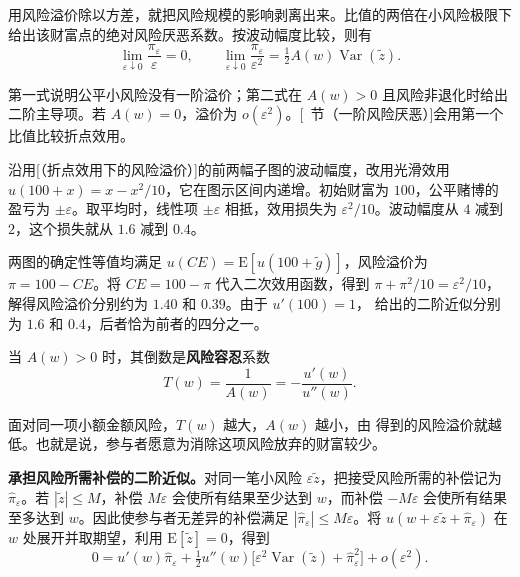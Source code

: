 用风险溢价除以方差，就把风险规模的影响剥离出来。比值的两倍在小风险极限下给出该财富点的绝对风险厌恶系数。按波动幅度比较，则有
\[
 \lim_{\varepsilon\downarrow0}\frac{\pi_\varepsilon}{\varepsilon}=0,
 \qquad
 \lim_{\varepsilon\downarrow0}\frac{\pi_\varepsilon}{\varepsilon^2}
 =\tfrac12 A(w)\operatorname{Var}(\tilde z).
\]

第一式说明公平小风险没有一阶溢价；第二式在 $A(w)>0$ 且风险非退化时给出二阶主导项。若 $A(w)=0$，溢价为 $o(\varepsilon^2)$。[~节（一阶风险厌恶）]会用第一个比值比较折点效用。

 沿用[（折点效用下的风险溢价）]的前两幅子图的波动幅度，改用光滑效用 $u(100+x)=x-x^2/10$，它在图示区间内递增。初始财富为 $100$，公平赌博的盈亏为 $\pm\varepsilon$。取平均时，线性项 $\pm\varepsilon$ 相抵，效用损失为 $\varepsilon^2/10$。波动幅度从 $4$ 减到 $2$，这个损失就从 $1.6$ 减到 $0.4$。

两图的确定性等值均满足 $u(CE)=\mathrm E[u(100+\tilde g)]$，风险溢价为 $\pi=100-CE$。将 $CE=100-\pi$ 代入二次效用函数，得到 $\pi+\pi^2/10=\varepsilon^2/10$，解得风险溢价分别约为 $1.40$ 和 $0.39$。由于 $u'(100)=1$， 给出的二阶近似分别为 $1.6$ 和 $0.4$，后者恰为前者的四分之一。

\begin{center}
\begin{minipage}{\linewidth}
%
\centering
{}
\end{minipage}
\end{center}

\hypertarget{wj-risk-tolerance}{}
\begin{tcolorbox}[knowledge,title=风险容忍系数]
当 $A(w)>0$ 时，其倒数是\textbf{风险容忍}系数
\begin{equation}
    T(w)=\frac{1}{A(w)}=-\frac{u'(w)}{u''(w)}.
\label{eq:wj-seven-3}
\end{equation}

面对同一项小额金额风险，$T(w)$ 越大，$A(w)$ 越小，由 得到的风险溢价就越低。也就是说，参与者愿意为消除这项风险放弃的财富较少。
\end{tcolorbox}

\textbf{承担风险所需补偿的二阶近似。}对同一笔小风险 $\varepsilon\tilde z$，把接受风险所需的补偿记为 $\hat\pi_\varepsilon$。若 $|\tilde z|\le M$，补偿 $M\varepsilon$ 会使所有结果至少达到 $w$，而补偿 $-M\varepsilon$ 会使所有结果至多达到 $w$。因此使参与者无差异的补偿满足 $|\hat\pi_\varepsilon|\le M\varepsilon$。将 $u(w+\varepsilon\tilde z+\hat\pi_\varepsilon)$ 在 $w$ 处展开并取期望，利用 $\mathrm E[\tilde z]=0$，得到
\[
 0=u'(w)\hat\pi_\varepsilon
   +\tfrac12u''(w)\bigl[\varepsilon^2\operatorname{Var}(\tilde z)
                        +\hat\pi_\varepsilon^2\bigr]
   +o(\varepsilon^2).
\]

